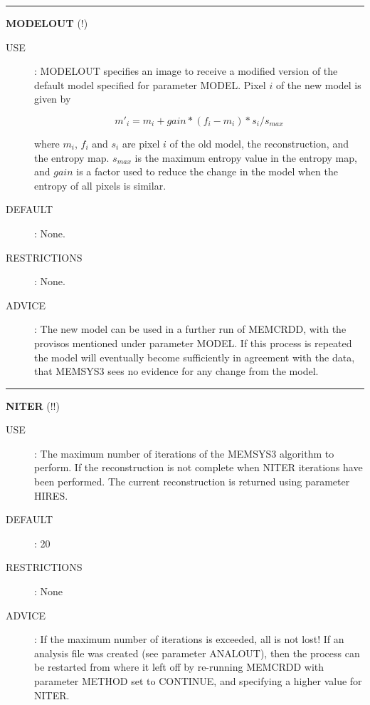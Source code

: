 \rule{\textwidth}{0.3mm}
{\Large {\bf MODELOUT } (!)}
\begin{description}
\item [USE]:
MODELOUT specifies an image to receive a modified version of the default model 
specified for parameter MODEL. Pixel $i$ of the new model is given by

\begin {equation}
m'_{i}=m_{i}+gain*(f_{i}-m_{i})*s_{i}/s_{max}
\end {equation}

where $m_{i}$, $f_{i}$ and $s_{i}$ are pixel $i$ of the old model, the 
reconstruction, and the entropy map. $s_{max}$ is the maximum entropy value in 
the entropy map, and $gain$ is a factor used to reduce the change in
the model when the entropy of all pixels is similar. 
\item [DEFAULT]:
None.
\item [RESTRICTIONS]:
None.
\item [ADVICE]:
The new model can be used in a further run of MEMCRDD, with the provisos
mentioned under parameter MODEL. If this process is repeated the model will 
eventually become sufficiently in agreement with the data, that MEMSYS3 sees no 
evidence for any change from the model.
\end {description}

\rule{\textwidth}{0.3mm}
{\Large {\bf NITER} (!!)}
\begin{description}
\item [USE]:
The maximum number of iterations of the MEMSYS3 algorithm to perform. If the 
reconstruction is not complete when NITER iterations have been performed. The 
current reconstruction is returned using parameter HIRES.
\item [DEFAULT]:
20
\item [RESTRICTIONS]:
None
\item [ADVICE]:
If the maximum number of iterations is exceeded, all is not lost! If an analysis 
file was created (see parameter ANALOUT), then the process can be restarted from 
where it left off by re-running MEMCRDD with parameter METHOD set to CONTINUE, 
and specifying a higher value for NITER.
\end {description}

